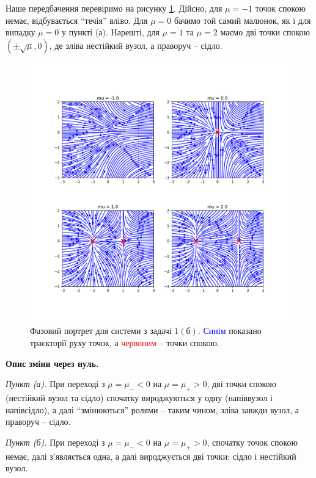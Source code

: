 \documentclass[oneside,solution]{tmpl}
\begin{document}
Наше передбачення перевіримо на рисунку \ref{fig:problem_1b}. Дійсно, для $\mu=-1$ точок спокою немає, відбувається ``течія'' вліво. Для $\mu=0$ бачимо той самий малюнок, як і для випадку $\mu=0$ у пункті (а). Нарешті, для $\mu=1$ та $\mu=2$ маємо дві точки спокою $(\pm\sqrt{\mu}, 0)$, де зліва нестійкий вузол, а праворуч -- сідло.

\begin{figure}
    \centering
    \includegraphics[width=\textwidth]{images/test/problem_1b.pdf}
    \caption{Фазовий портрет для системи з задачі $1(\text{б})$. \textcolor{blue}{Синім} показано траєкторії руху точок, а \textcolor{red}{червоним} -- точки спокою.}
    \label{fig:problem_1b}
\end{figure}

\pagebreak
\textbf{Опис зміни через нуль.} 

\textit{Пункт (а).} При переході з $\mu=\mu_- < 0$ на $\mu=\mu_+ > 0$, дві точки спокою (нестійкий вузол та сідло) спочатку вироджуються у одну (напіввузол і напівсідло), а далі ``змінюються'' ролями -- таким чином, зліва завжди вузол, а праворуч -- сідло.

\textit{Пункт (б).} При переході з $\mu=\mu_- < 0$ на $\mu=\mu_+ > 0$, спочатку точок спокою немає, далі з'являється одна, а далі вироджується дві точки: сідло і нестійкий вузол.
\end{document}
